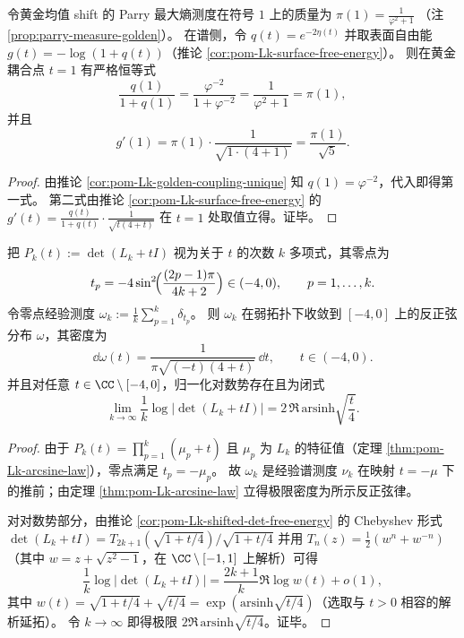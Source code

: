 \begin{corollary}[边界熵导数与 Parry 质量的精确耦合：\texorpdfstring{\(t=1\)}{t=1} 处的同源闭合]\label{cor:pom-Lk-t1-parry-surface-derivative}
令黄金均值 shift 的 Parry 最大熵测度在符号 \(1\) 上的质量为
\(
\pi(1)=\frac{1}{\varphi^2+1}
\)
（注 \ref{prop:parry-measure-golden}）。
在谱侧，令 \(q(t)=e^{-2\eta(t)}\) 并取表面自由能 \(g(t)=-\log(1+q(t))\)（推论 \ref{cor:pom-Lk-surface-free-energy}）。
则在黄金耦合点 \(t=1\) 有严格恒等式
\[
\frac{q(1)}{1+q(1)}=\frac{\varphi^{-2}}{1+\varphi^{-2}}=\frac{1}{\varphi^2+1}=\pi(1),
\]
并且
\[
g'(1)=\pi(1)\cdot\frac{1}{\sqrt{1\cdot(4+1)}}=\frac{\pi(1)}{\sqrt5}.
\]
\end{corollary}
\begin{proof}
由推论 \ref{cor:pom-Lk-golden-coupling-unique} 知 \(q(1)=\varphi^{-2}\)，代入即得第一式。
第二式由推论 \ref{cor:pom-Lk-surface-free-energy} 的
\(
g'(t)=\frac{q(t)}{1+q(t)}\cdot \frac{1}{\sqrt{t(4+t)}}
\)
在 \(t=1\) 处取值立得。证毕。
\end{proof}

\begin{theorem}\label{thm:pom-Lk-fisher-zeros-arcsine}
把 \(P_k(t):=\det(L_k+tI)\) 视为关于 \(t\) 的次数 \(k\) 多项式，其零点为
\[
t_p=-4\sin^2\!\Bigl(\frac{(2p-1)\pi}{4k+2}\Bigr)\in(-4,0),
\qquad p=1,\dots,k.
\]
令零点经验测度
\(
\omega_k:=\frac1k\sum_{p=1}^k\delta_{t_p}
\)。
则 \(\omega_k\) 在弱拓扑下收敛到 \([-4,0]\) 上的反正弦分布 \(\omega\)，其密度为
\[
\dd\omega(t)=\frac{1}{\pi\sqrt{(-t)(4+t)}}\,\dd t,\qquad t\in(-4,0).
\]
并且对任意 \(t\in\CC\setminus[-4,0]\)，归一化对数势存在且为闭式
\[
\lim_{k\to\infty}\frac{1}{k}\log\bigl|\det(L_k+tI)\bigr|
=2\,\Re\,\mathrm{arsinh}\sqrt{\frac{t}{4}}.
\]
\end{theorem}
\begin{proof}
由于 \(P_k(t)=\prod_{p=1}^k(\mu_p+t)\) 且 \(\mu_p\) 为 \(L_k\) 的特征值（定理 \ref{thm:pom-Lk-arcsine-law}），零点满足 \(t_p=-\mu_p\)。
故 \(\omega_k\) 是经验谱测度 \(\nu_k\) 在映射 \(t=-\mu\) 下的推前；由定理 \ref{thm:pom-Lk-arcsine-law} 立得极限密度为所示反正弦律。

对对数势部分，由推论 \ref{cor:pom-Lk-shifted-det-free-energy} 的 Chebyshev 形式
\(
\det(L_k+tI)=T_{2k+1}(\sqrt{1+t/4})/\sqrt{1+t/4}
\)
并用 \(T_n(z)=\frac12(w^n+w^{-n})\)（其中 \(w=z+\sqrt{z^2-1}\)，在 \(\CC\setminus[-1,1]\) 上解析）可得
\[
\frac{1}{k}\log|\det(L_k+tI)|
=\frac{2k+1}{k}\Re\log w(t)+o(1),
\]
其中 \(w(t)=\sqrt{1+t/4}+\sqrt{t/4}=\exp(\mathrm{arsinh}\sqrt{t/4})\)（选取与 \(t>0\) 相容的解析延拓）。
令 \(k\to\infty\) 即得极限 \(2\Re\,\mathrm{arsinh}\sqrt{t/4}\)。证毕。
\end{proof}

